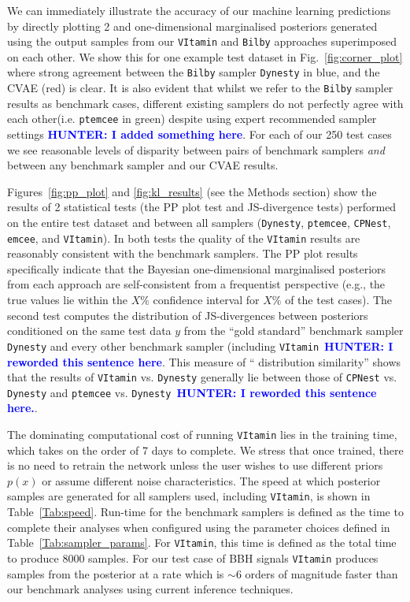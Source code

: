 \documentclass[%
showpacs,
nofootinbib,
 amsmath,amssymb,
 aps,
 twocolumn,
 prl,
 reprint,
floatfix,
]{revtex4-1}
\newcommand{\hunter}[1]{\textbf{\textcolor{blue}{HUNTER: #1}}}
\begin{document}
%
%
We can immediately illustrate the accuracy of our machine learning predictions
by directly plotting 2 and one-dimensional marginalised posteriors generated
using the output samples from our \texttt{VItamin} and \texttt{Bilby}
approaches superimposed on each other. We show this for one example test
dataset in Fig.~\ref{fig:corner_plot} where strong agreement between the
\texttt{Bilby} sampler \texttt{Dynesty} in blue,  and the
\ac{CVAE} (red) is clear. It is also evident that whilst we refer to the
\texttt{Bilby} sampler results as benchmark cases, different existing samplers
do not perfectly agree with each other(i.e. \texttt{ptemcee} in green) despite using 
expert recommended sampler settings \hunter{I added something here}.  For each of our 
250 test cases we see
reasonable levels of disparity between pairs of benchmark samplers \emph{and}
between any benchmark sampler and our \ac{CVAE} results. 

%
%
Figures~\ref{fig:pp_plot} and \ref{fig:kl_results} (see the Methods section)
show the results of 2 statistical tests (the \ac{PP} plot test and
\ac{JS}-divergence tests) performed on the entire test dataset and between all
samplers (\texttt{Dynesty}, \texttt{ptemcee}, \texttt{CPNest}, \texttt{emcee}, and \texttt{VItamin}). In
both tests the quality of the \texttt{VItamin} results are reasonably consistent with the
benchmark samplers. The \ac{PP} plot results specifically indicate that the
Bayesian one-dimensional marginalised posteriors from each approach are
self-consistent from a frequentist perspective (e.g., the true values lie
within the $X\%$ confidence interval for $X\%$ of the test cases). The second
test computes the distribution of \ac{JS}-divergences between posteriors
conditioned on the same test data $y$ from the ``gold standard'' benchmark 
sampler \texttt{Dynesty} and every other benchmark sampler (including 
\texttt{VItamin}~\hunter{I reworded this sentence here}.  This measure of ``
distribution similarity'' shows that the results of \texttt{VItamin} vs. 
\texttt{Dynesty} generally lie between those of  \texttt{CPNest} vs. 
\texttt{Dynesty} and \texttt{ptemcee} vs. \texttt{Dynesty}~\hunter{I reworded 
this sentence here.}.

%
%
The dominating computational cost of running \texttt{VItamin} lies in the
training time, which takes on the order of 7 days to complete. We
stress that once trained, there is no need to retrain the network unless the
user wishes to use different priors $p(x)$ or assume different noise
characteristics. The speed at which posterior samples are generated for all
samplers used, including \texttt{VItamin}, is shown in Table~\ref{Tab:speed}.
Run-time for the benchmark samplers is defined as the time to complete their
analyses when configured using the parameter choices defined in
Table~\ref{Tab:sampler_params}. For \texttt{VItamin}, this time is defined as
the total time to produce $8000$ samples. For our test case of \ac{BBH} signals
\texttt{VItamin} produces samples from the posterior at a rate which is $\sim
6$ orders of magnitude faster than our benchmark analyses using current
inference techniques. 
\end{document}
